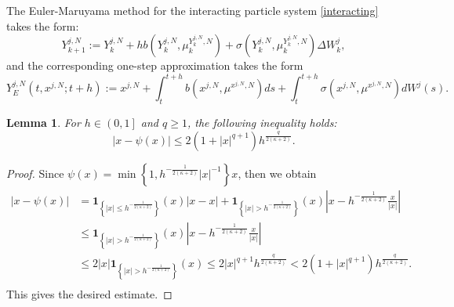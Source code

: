 \documentclass[12pt]{article}
\numberwithin{equation}{section}
\newtheorem{lemma}[assumption]{Lemma}
\begin{document}
The Euler-Maruyama method for the interacting particle system \eqref{interacting} takes the form:
\begin{equation}\tag{5.91}\label{5.64}
Y^{j,N}_{k+1}:={Y}^{j,N}_k+hb\left({Y}^{j,N}_k,\mu^{{Y}^{j,N}_k,N}_k\right)+\sigma\left({Y}^{j,N}_k,\mu^{{Y}^{j,N}_k,N}_k\right) \Delta W^{j}_{k},
\end{equation}
and the corresponding one-step approximation takes the form
\begin{equation}\tag{5.92}\label{5.65}
Y^{j,N}_{E}\left( t,x^{j,N};t+h \right) :=x^{j,N}+\int_t^{t+h}{b\left( x^{j,N},\mu ^{x^{j,N},N} \right)}ds+\int_t^{t+h}{\sigma \left( x^{j,N},\mu ^{x^{j,N},N} \right)}dW^j\left( s \right).
\end{equation}
\begin{lemma}\label{lemmma5.5}
       For $h \in \left(0,1\right]$ and $q \geq 1$, the following inequality holds:
\begin{equation}\tag{5.93}\label{5.62}
\left|x-\psi\left(x\right)\right| \leq 2\left(1+\left|x\right|^{q+1}\right) h^{\frac{q}{2\left(\kappa+2\right)}}.
\end{equation}
\end{lemma}
\begin{proof}
Since $\psi\left(x\right) = \min \left\{ 1, h^{-\tfrac{1}{2\left(\kappa + 2\right)}} \left|x\right|^{-1} \right\} x$, then we obtain
\begin{equation}\tag{5.94}
\begin{aligned}
    \left| x-\psi \left(x\right) \right|&=\mathbf{1}_{\left\{ \left| x \right|\leq h^{-{\frac{1}{2\left( \kappa +2 \right)}}} \right\}}\left(x\right)\left| x-x \right|+\mathbf{1}_{\left\{ \left| x \right|>h^{-{\frac{1}{2\left( \kappa +2 \right)}}} \right\}}\left(x\right)\left| x-h^{-{\frac{1}{2\left( \kappa +2 \right)}}}\tfrac{x}{\left| x \right|} \right|
\\
&\leq \mathbf{1}_{\left\{ \left| x \right|>h^{-{\frac{1}{2\left( \kappa +2 \right)}}} \right\}}\left(x\right)\left| x-h^{-{\frac{1}{2\left( \kappa +2 \right)}}}\tfrac{x}{\left| x \right|} \right|
\\
&\leq 2\left| x \right|\mathbf{1}_{\left\{ \left| x \right|>h^{-{\frac{1}{2\left( \kappa +2 \right)}}} \right\}}\left(x\right)\leq 2\left| x \right|^{q+1}h^{{\frac{q}{2\left( \kappa +2 \right)}}}<2\left( 1+\left| x \right|^{q+1} \right) h^{{\frac{q}{2\left( \kappa +2 \right)}}}.\\
\end{aligned}
\end{equation}
This gives the desired estimate. 
\end{proof}
\end{document}

